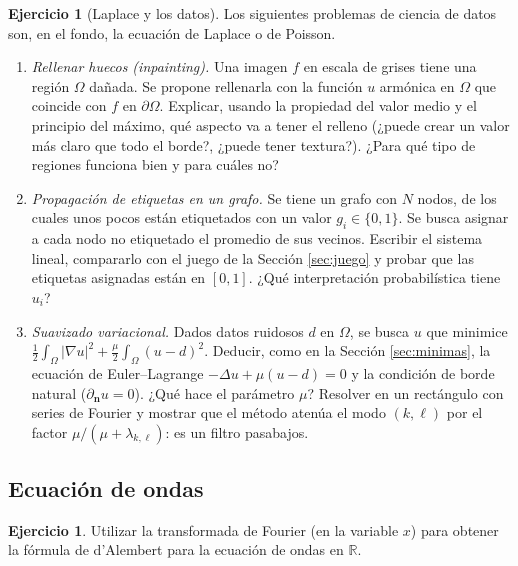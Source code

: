 \documentclass[12pt, a4paper]{amsbook}
\newcommand{\R}{{\mathbb R}}
\newcommand{\n}{{\mathbf n}}
\theoremstyle{remark}
\theoremstyle{definition}
\newtheorem{ejer}[teo]{Ejercicio}
\numberwithin{section}{chapter}
\numberwithin{subsection}{section}
\numberwithin{equation}{section}
\numberwithin{figure}{chapter}
\begin{document}
\begin{ejer}[Laplace y los datos]
Los siguientes problemas de ciencia de datos son, en el fondo, la ecuación de Laplace o de Poisson.
\begin{enumerate}
\item \emph{Rellenar huecos (inpainting).} Una imagen $f$ en escala de grises tiene una región $\Omega$ dañada. Se propone rellenarla con la función $u$ armónica en $\Omega$ que coincide con $f$ en $\partial\Omega$. Explicar, usando la propiedad del valor medio y el principio del máximo, qué aspecto va a tener el relleno (¿puede crear un valor más claro que todo el borde?, ¿puede tener textura?). ¿Para qué tipo de regiones funciona bien y para cuáles no?
\item \emph{Propagación de etiquetas en un grafo.} Se tiene un grafo con $N$ nodos, de los cuales unos pocos están etiquetados con un valor $g_i\in\{0,1\}$. Se busca asignar a cada nodo no etiquetado el promedio de sus vecinos. Escribir el sistema lineal, compararlo con el juego de la Sección \ref{sec:juego} y probar que las etiquetas asignadas están en $[0,1]$. ¿Qué interpretación probabilística tiene $u_i$?
\item \emph{Suavizado variacional.} Dados datos ruidosos $d$ en $\Omega$, se busca $u$ que minimice $\frac12\int_\Omega|\nabla u|^2 + \frac{\mu}{2}\int_\Omega (u-d)^2$. Deducir, como en la Sección \ref{sec:minimas}, la ecuación de Euler--Lagrange $-\Delta u + \mu(u-d) = 0$ y la condición de borde natural ($\partial_\n u = 0$). ¿Qué hace el parámetro $\mu$? Resolver en un rectángulo con series de Fourier y mostrar que el método atenúa el modo $(k,\ell)$ por el factor $\mu/(\mu+\lambda_{k,\ell})$: es un filtro pasabajos.
\end{enumerate}
\end{ejer}

\subsection*{Ecuación de ondas}

\begin{ejer}
Utilizar la transformada de Fourier (en la variable $x$) para obtener la fórmula de d'Alembert para la ecuación de ondas en $\R$.
\end{ejer}
\end{document}

